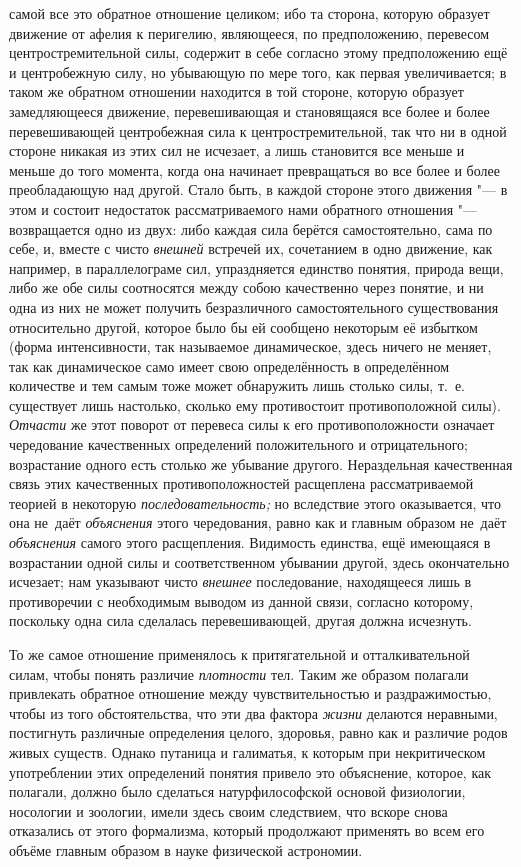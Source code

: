 самой все это обратное отношение целиком; ибо та сторона, которую образует
движение от афелия к перигелию, являющееся, по предположению, перевесом
центростремительной силы, содержит в себе согласно этому предположению ещё и
центробежную силу, но убывающую по мере того, как первая увеличивается; в таком
же обратном отношении находится в той стороне, которую образует замедляющееся
движение, перевешивающая и становящаяся все более и более перевешивающей
центробежная сила к центростремительной, так что ни в одной стороне никакая из
этих сил не исчезает, а лишь становится все меньше и меньше до того момента,
когда она начинает превращаться во все более и более преобладающую над другой.
Стало быть, в каждой стороне этого движения "--- в этом и состоит недостаток
рассматриваемого нами обратного отношения "--- возвращается одно из двух: либо
каждая сила берётся самостоятельно, сама по себе, и, вместе с чисто {\em
внешней} встречей их, сочетанием в одно движение, как например, в
параллелограме сил, упраздняется единство понятия, природа вещи, либо же обе
силы соотносятся между собою качественно через понятие, и ни одна из них не
может получить безразличного самостоятельного существования относительно
другой, которое было бы ей сообщено некоторым её избытком (форма интенсивности,
так называемое динамическое, здесь ничего не меняет, так как динамическое само
имеет свою определённость в определённом количестве и тем самым тоже может
обнаружить лишь столько силы, т.~е. существует лишь настолько, сколько ему
противостоит противоположной силы). {\em Отчасти} же этот поворот от перевеса
силы к его противоположности означает чередование качественных определений
положительного и отрицательного; возрастание одного есть столько же убывание
другого. Нераздельная качественная связь этих качественных противоположностей
расщеплена рассматриваемой теорией в некоторую {\em последовательность;} но
вследствие этого оказывается, что она не~даёт {\em объяснения} этого
чередования, равно как и главным образом не~даёт {\em объяснения} самого этого
расщепления. Видимость единства, ещё имеющаяся в возрастании одной силы и
соответственном убывании другой, здесь окончательно исчезает; нам указывают
чисто {\em внешнее} последование, находящееся лишь в противоречии с необходимым
выводом из данной связи, согласно которому, поскольку одна сила сделалась
перевешивающей, другая должна исчезнуть.

То же самое отношение применялось к притягательной и отталкивательной силам,
чтобы понять различие {\em плотности} тел. Таким же образом полагали привлекать
обратное отношение между чувствительностью и раздражимостью, чтобы из того
обстоятельства, что эти два фактора {\em жизни} делаются неравными, постигнуть
различные определения целого, здоровья, равно как и различие родов живых
существ. Однако путаница и галиматья, к которым при некритическом употреблении
этих определений понятия привело это объяснение, которое, как полагали, должно
было сделаться натурфилософской основой физиологии, носологии и зоологии, имели
здесь своим следствием, что вскоре снова отказались от этого формализма,
который продолжают применять во всем его объёме главным образом в науке
физической астрономии.

